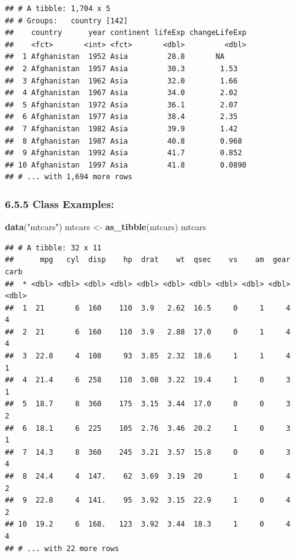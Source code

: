 \documentclass[]{article}
\newenvironment{Shaded}{\begin{snugshade}}{\end{snugshade}}
\newcommand{\KeywordTok}[1]{\textcolor[rgb]{0.13,0.29,0.53}{\textbf{#1}}}
\newcommand{\StringTok}[1]{\textcolor[rgb]{0.31,0.60,0.02}{#1}}
\newcommand{\NormalTok}[1]{#1}
\begin{document}
\begin{verbatim}
## # A tibble: 1,704 x 5
## # Groups:   country [142]
##    country      year continent lifeExp changeLifeExp
##    <fct>       <int> <fct>       <dbl>         <dbl>
##  1 Afghanistan  1952 Asia         28.8       NA     
##  2 Afghanistan  1957 Asia         30.3        1.53  
##  3 Afghanistan  1962 Asia         32.0        1.66  
##  4 Afghanistan  1967 Asia         34.0        2.02  
##  5 Afghanistan  1972 Asia         36.1        2.07  
##  6 Afghanistan  1977 Asia         38.4        2.35  
##  7 Afghanistan  1982 Asia         39.9        1.42  
##  8 Afghanistan  1987 Asia         40.8        0.968 
##  9 Afghanistan  1992 Asia         41.7        0.852 
## 10 Afghanistan  1997 Asia         41.8        0.0890
## # ... with 1,694 more rows
\end{verbatim}

\subsubsection{6.5.5 Class Examples:}\label{class-examples}

\begin{Shaded}
\begin{Highlighting}[]
\KeywordTok{data}\NormalTok{(}\StringTok{"mtcars"}\NormalTok{)}
\NormalTok{mtcars <-}\StringTok{ }\KeywordTok{as_tibble}\NormalTok{(mtcars)}
\NormalTok{mtcars}
\end{Highlighting}
\end{Shaded}

\begin{verbatim}
## # A tibble: 32 x 11
##      mpg   cyl  disp    hp  drat    wt  qsec    vs    am  gear  carb
##  * <dbl> <dbl> <dbl> <dbl> <dbl> <dbl> <dbl> <dbl> <dbl> <dbl> <dbl>
##  1  21       6  160    110  3.9   2.62  16.5     0     1     4     4
##  2  21       6  160    110  3.9   2.88  17.0     0     1     4     4
##  3  22.8     4  108     93  3.85  2.32  18.6     1     1     4     1
##  4  21.4     6  258    110  3.08  3.22  19.4     1     0     3     1
##  5  18.7     8  360    175  3.15  3.44  17.0     0     0     3     2
##  6  18.1     6  225    105  2.76  3.46  20.2     1     0     3     1
##  7  14.3     8  360    245  3.21  3.57  15.8     0     0     3     4
##  8  24.4     4  147.    62  3.69  3.19  20       1     0     4     2
##  9  22.8     4  141.    95  3.92  3.15  22.9     1     0     4     2
## 10  19.2     6  168.   123  3.92  3.44  18.3     1     0     4     4
## # ... with 22 more rows
\end{verbatim}
\end{document}
